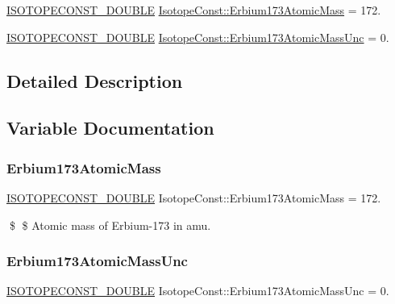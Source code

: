 \begin{DoxyCompactItemize}
\item 
\mbox{\hyperlink{group___isotope_const-_macros_ga8f45a7272ce02c0b4c65c44636ed719a}{I\+S\+O\+T\+O\+P\+E\+C\+O\+N\+S\+T\+\_\+\+D\+O\+U\+B\+LE}} \mbox{\hyperlink{group___isotope_const-_erbium-_er173_ga9b4f6d79de175b9add2d137633b2d9c2}{Isotope\+Const\+::\+Erbium173\+Atomic\+Mass}} = 172.
\item 
\mbox{\hyperlink{group___isotope_const-_macros_ga8f45a7272ce02c0b4c65c44636ed719a}{I\+S\+O\+T\+O\+P\+E\+C\+O\+N\+S\+T\+\_\+\+D\+O\+U\+B\+LE}} \mbox{\hyperlink{group___isotope_const-_erbium-_er173_ga4b4e951ebac3ab3910ec9d8f6fc9f16d}{Isotope\+Const\+::\+Erbium173\+Atomic\+Mass\+Unc}} = 0.
\end{DoxyCompactItemize}


\subsection{Detailed Description}


\subsection{Variable Documentation}
\mbox{\label{group___isotope_const-_erbium-_er173_ga9b4f6d79de175b9add2d137633b2d9c2}} 
\subsubsection{\texorpdfstring{Erbium173\+Atomic\+Mass}{Erbium173AtomicMass}}
{\footnotesize\ttfamily \mbox{\hyperlink{group___isotope_const-_macros_ga8f45a7272ce02c0b4c65c44636ed719a}{I\+S\+O\+T\+O\+P\+E\+C\+O\+N\+S\+T\+\_\+\+D\+O\+U\+B\+LE}} Isotope\+Const\+::\+Erbium173\+Atomic\+Mass = 172.}

\$ \$ Atomic mass of Erbium-\/173 in amu. \mbox{\label{group___isotope_const-_erbium-_er173_ga4b4e951ebac3ab3910ec9d8f6fc9f16d}} 
\subsubsection{\texorpdfstring{Erbium173\+Atomic\+Mass\+Unc}{Erbium173AtomicMassUnc}}
{\footnotesize\ttfamily \mbox{\hyperlink{group___isotope_const-_macros_ga8f45a7272ce02c0b4c65c44636ed719a}{I\+S\+O\+T\+O\+P\+E\+C\+O\+N\+S\+T\+\_\+\+D\+O\+U\+B\+LE}} Isotope\+Const\+::\+Erbium173\+Atomic\+Mass\+Unc = 0.}


